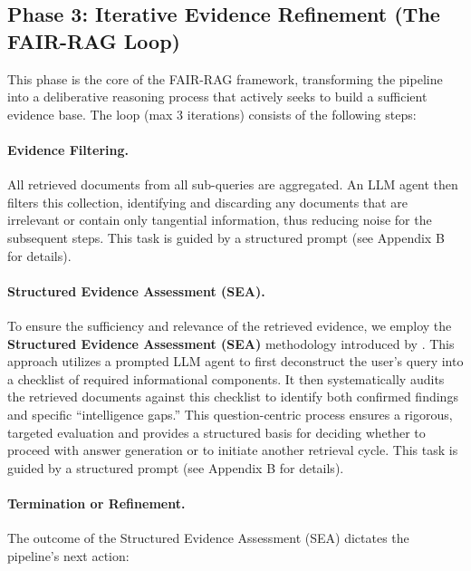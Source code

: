 \documentclass[11pt]{article}
\begin{document}
\subsection{Phase 3: Iterative Evidence Refinement (The FAIR-RAG Loop)}

This phase is the core of the FAIR-RAG framework, transforming the pipeline into a deliberative reasoning process that actively seeks to build a sufficient evidence base. The loop (max 3 iterations) consists of the following steps:

\paragraph{Evidence Filtering.}
All retrieved documents from all sub-queries are aggregated. An LLM agent then filters this collection, identifying and discarding any documents that are irrelevant or contain only tangential information, thus reducing noise for the subsequent steps. \cite{fairrag} This task is guided by a structured prompt (see Appendix B for details).

\paragraph{Structured Evidence Assessment (SEA).}
To ensure the sufficiency and relevance of the retrieved evidence, we employ the \textbf{Structured Evidence Assessment (SEA)} methodology introduced by \cite{fairrag}. This approach utilizes a prompted LLM agent to first deconstruct the user's query into a checklist of required informational components. It then systematically audits the retrieved documents against this checklist to identify both confirmed findings and specific ``intelligence gaps.'' This question-centric process ensures a rigorous, targeted evaluation and provides a structured basis for deciding whether to proceed with answer generation or to initiate another retrieval cycle. This task is guided by a structured prompt (see Appendix B for details).

\paragraph{Termination or Refinement.}
The outcome of the Structured Evidence Assessment (SEA) dictates the pipeline's next action:
\end{document}
